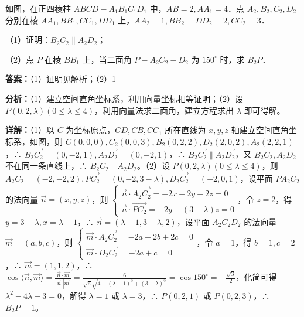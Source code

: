 \begin{question}[points=12]
如图，在正四棱柱 $ABCD-A_1B_1C_1D_1$ 中，$AB=2, AA_1=4$．点 $A_2, B_2, C_2, D_2$ 分别在棱 $AA_1, BB_1, CC_1, DD_1$ 上，$AA_2=1, BB_2=DD_2=2, CC_2=3$．



（1）证明：$B_2C_2\parallel A_2D_2$；

（2）点 $P$ 在棱 $BB_1$ 上，当二面角 $P-A_2C_2-D_2$ 为 $150^\circ$ 时，求 $B_2P$．
\begin{solution}
\textbf{答案：}（1）证明见解析；（2）1

\textbf{分析：}（1）建立空间直角坐标系，利用向量坐标相等证明；（2）设 $P(0,2,\lambda)(0\leq\lambda\leq4)$，利用向量法求二面角，建立方程求出 $\lambda$ 即可得解。

\textbf{详解：}（1）以 $C$ 为坐标原点，$CD, CB, CC_1$ 所在直线为 $x, y, z$ 轴建立空间直角坐标系，如图，则 $C(0,0,0), C_2(0,0,3), B_2(0,2,2), D_2(2,0,2), A_2(2,2,1)$，∴ $\overrightarrow{B_2C_2}=(0,-2,1), \overrightarrow{A_2D_2}=(0,-2,1)$，∴ $\overrightarrow{B_2C_2}\parallel\overrightarrow{A_2D_2}$，又 $B_2C_2, A_2D_2$ 不在同一条直线上，∴ $B_2C_2\parallel A_2D_2$。（2）设 $P(0,2,\lambda)(0\leq\lambda\leq4)$，则 $\overrightarrow{A_2C_2}=(-2,-2,2), \overrightarrow{PC_2}=(0,-2,3-\lambda), \overrightarrow{D_2C_2}=(-2,0,1)$，设平面 $PA_2C_2$ 的法向量 $\vec{n}=(x,y,z)$，则 $\begin{cases} \vec{n}\cdot\overrightarrow{A_2C_2}=-2x-2y+2z=0 \\ \vec{n}\cdot\overrightarrow{PC_2}=-2y+(3-\lambda)z=0 \end{cases}$，令 $z=2$，得 $y=3-\lambda, x=\lambda-1$，∴ $\vec{n}=(\lambda-1,3-\lambda,2)$，设平面 $A_2C_2D_2$ 的法向量 $\vec{m}=(a,b,c)$，则 $\begin{cases} \vec{m}\cdot\overrightarrow{A_2C_2}=-2a-2b+2c=0 \\ \vec{m}\cdot\overrightarrow{D_2C_2}=-2a+c=0 \end{cases}$，令 $a=1$，得 $b=1, c=2$，∴ $\vec{m}=(1,1,2)$，∴ $\cos\langle\vec{n},\vec{m}\rangle=\frac{\vec{n}\cdot\vec{m}}{|\vec{n}||\vec{m}|}=\frac{6}{\sqrt{6}\sqrt{4+(\lambda-1)^2+(3-\lambda)^2}}=\cos150^\circ=-\frac{\sqrt{3}}{2}$，化简可得 $\lambda^2-4\lambda+3=0$，解得 $\lambda=1$ 或 $\lambda=3$，∴ $P(0,2,1)$ 或 $P(0,2,3)$，∴ $B_2P=1$。
\end{solution}
\end{question}

